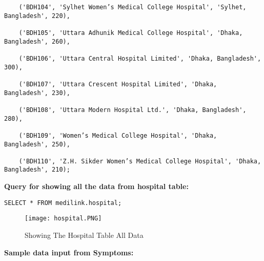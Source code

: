 \documentclass[11pt]{article}
\begin{document}
\begin{lstlisting}
    ('BDH104', 'Sylhet Women’s Medical College Hospital', 'Sylhet, Bangladesh', 220),
    
    ('BDH105', 'Uttara Adhunik Medical College Hospital', 'Dhaka, Bangladesh', 260),
    
    ('BDH106', 'Uttara Central Hospital Limited', 'Dhaka, Bangladesh', 300),
    
    ('BDH107', 'Uttara Crescent Hospital Limited', 'Dhaka, Bangladesh', 230),
    
    ('BDH108', 'Uttara Modern Hospital Ltd.', 'Dhaka, Bangladesh', 280),
    
    ('BDH109', 'Women’s Medical College Hospital', 'Dhaka, Bangladesh', 250),
    
    ('BDH110', 'Z.H. Sikder Women’s Medical College Hospital', 'Dhaka, Bangladesh', 210);
\end{lstlisting}

\textbf{Query for showing all the data from hospital table: }
\begin{lstlisting}
SELECT * FROM medilink.hospital;
\end{lstlisting}
\begin{figure}[H]
    \centering
    \texttt{[image: hospital.PNG]}
    \caption{Showing The Hospital Table All Data}
    \label{fig:1}
\end{figure}

\textbf{Sample data input from Symptoms:}
\end{document}
